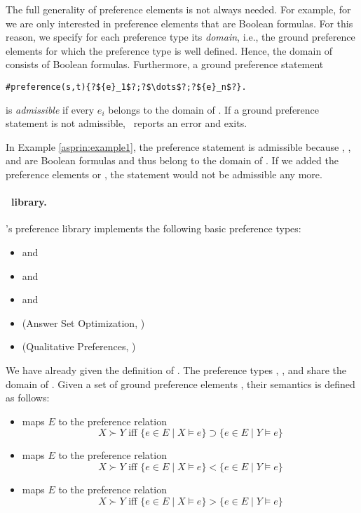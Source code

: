 The full generality of preference elements is not always needed.
For example, for  we are only interested in preference elements that are Boolean formulas.
For this reason, we specify for each preference type its \emph{domain}, 
i.e., the ground preference elements for which the preference type is well defined.
Hence, the domain of  consists of Boolean formulas.
Furthermore, a ground preference statement
\begin{lstlisting}[numbers=none,escapechar=?]
#preference(s,t){?${e}_1$?;?$\dots$?;?${e}_n$?}.
\end{lstlisting}
is \emph{admissible} if every ${e}_i$ belongs to the domain of .
If a ground preference statement is not admissible, \asprin\ reports an error and exits. 
\begin{example}
In Example \ref{asprin:example1}, the preference statement   
is admissible because , , and  are Boolean formulas
and thus belong to the domain of . 
If we added the preference elements  or , 
the statement would not be admissible any more.
\end{example}

\paragraph{\asprin\ library.}
\asprin's preference library implements the following basic preference types:
\begin{itemize}
	\item  {} and    
	\item  {} and    
	\item  {} and    
	\item  {}   (Answer Set Optimization, \cite{brnitr03a})   
	\item  {} (Qualitative Preferences, \cite{rogima10a})  
\end{itemize}

We have already given the definition of . 
The preference types , , and  share the domain of .
Given a set of ground preference elements ,
their semantics is defined as follows:
\begin{itemize}
\item
{} maps $E$ to the preference relation
\[
X \succ Y \text{ iff } \{e\in E\mid X\models e\}\supset\{e\in E\mid Y\models e\}
\]
\item
{} maps $E$ to the preference relation
\[
X \succ Y \text{ iff } \{e\in E\mid X\models e\}<\{e\in E\mid Y\models e\}
\]
\item
{} maps $E$ to the preference relation
\[
X \succ Y \text{ iff } \{e\in E\mid X\models e\}>\{e\in E\mid Y\models e\}
\]
\end{itemize}

